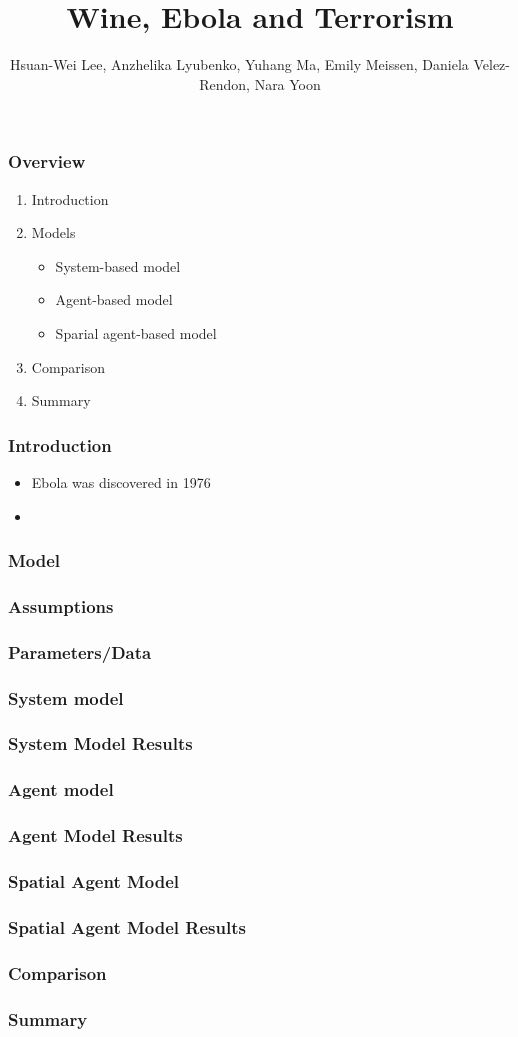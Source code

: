\documentclass[30pt]{beamer}
\author{ Hsuan-Wei Lee,
  Anzhelika Lyubenko,
  Yuhang Ma,
  Emily Meissen,
  Daniela Velez-Rendon,
    Nara Yoon}
\title[]{Wine, Ebola and Terrorism}
\begin{document}
\begin{frame}[t,plain]
    \titlepage
\end{frame}

\begin{frame}[t,plain]
    \frametitle{Overview}
\begin{enumerate}
\vfill
\item Introduction
\item Models
\begin{itemize}
\item System-based model
\item Agent-based model
\item Sparial agent-based model
\end{itemize}
\item Comparison
\item Summary
\end{enumerate}
\end{frame}

\begin{frame}
\frametitle{Introduction}
\begin{itemize}
\item Ebola was discovered in 1976
\item 
\end{itemize}
\end{frame}

\begin{frame}
\frametitle{Model}
\end{frame}

\begin{frame}
\frametitle{Assumptions}
\end{frame}

\begin{frame}
\frametitle{Parameters/Data}
\end{frame}

\begin{frame}
\frametitle{System model}
\end{frame}

\begin{frame}
\frametitle{System Model Results}
\end{frame}

\begin{frame}
\frametitle{Agent model}
\end{frame}

\begin{frame}
\frametitle{Agent Model Results}
\end{frame}

\begin{frame}
\frametitle{Spatial Agent Model}
\end{frame}


\begin{frame}
\frametitle{Spatial Agent Model Results}
\end{frame}

\begin{frame}
\frametitle{Comparison}
\end{frame}

\begin{frame}
\frametitle{Summary}
\end{frame}
\end{document}
